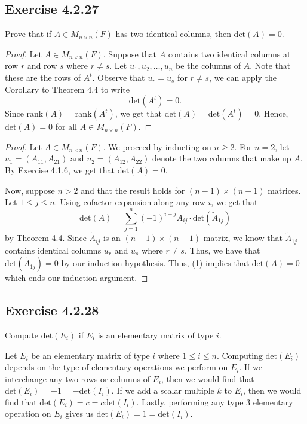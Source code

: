\subsection*{Exercise 4.2.27} Prove that if \( A \in {M}_{n \times n}(F) \) has two identical columns, then \( \text{det}(A) = 0  \).
\begin{proof}
    Let \( A \in {M}_{n \times n}(F) \). Suppose that \( A  \) contains two identical columns at row \( r  \) and row \( s  \) where \( r \neq s  \). Let \( {u}_{1}, {u}_{2}, \dots, {u}_{n}  \) be the columns of \( A \). Note that these are the rows of \( A^{t} \). Observe that \( {u}_{r} = {u}_{s} \) for \( r \neq s  \), we can apply the Corollary to Theorem 4.4 to write  
    \[  \text{det}(A^{t}) = 0.  \]
    Since \( \text{rank}(A) = \text{rank}(A^{t}) \), we get that \( \text{det}(A) = \text{det}(A^{t}) = 0  \). Hence, \( \text{det}(A) = 0 \) for all \( A \in {M}_{n \times n}(F)  \).
\end{proof}
\begin{proof}
Let \( A \in {M}_{n \times n}(F) \). We proceed by inducting on \( n \geq 2  \). For \( n = 2  \), let \( {u}_{1} = ({A}_{11}, {A}_{21}) \) and \( {u}_{2} = ({A}_{12}, {A}_{22} ) \) denote the two columns that make up \( A  \). By Exercise 4.1.6, we get that \( \text{det}(A) = 0  \).     

Now, suppose \( n > 2  \) and that the result holds for \( (n-1) \times (n-1)  \) matrices. Let \( 1 \leq j \leq n \). Using cofactor expansion along any row \( i \), we get that 
\[  \text{det}(A) = \sum_{ j=1 }^{ n } (-1)^{i + j} {A}_{ij} \cdot \text{det}({\tilde{A}}_{1j}) \tag{1} \] by Theorem 4.4.
Since \( {\tilde{A}}_{ij} \) is an \( (n-1) \times (n-1)  \) matrix, we know that \( {\tilde{A}}_{1j} \) contains identical columns \( {u}_{r}   \) and \( {u}_{s} \) where \( r \neq s  \). Thus, we have that \( \text{det}({\tilde{A}}_{1j}) = 0  \) by our induction hypothesis. Thus, (1) implies that \( \text{det}(A) = 0  \) which ends our induction argument. 
\end{proof}

\subsection*{Exercise 4.2.28} Compute \( \text{det}({E}_{i})  \) if \( {E}_{i} \) is an elementary matrix of type \( i  \).
\begin{solution}
Let \( {E}_{i} \) be an elementary matrix of type \( i \) where \( 1 \leq i \leq n  \). Computing \( \text{det}({E}_{i}) \) depends on the type of elementary operations we perform on \( {E}_{i} \). If we interchange any two rows or columns of \( {E}_{i}\), then we would find that \( \text{det}({E}_{i}) = - 1 = - \text{det}({I}_{i}) \). If we add a scalar multiple \( k  \) to \( {E}_{i} \), then we would find that \( \text{det}({E}_{i}) = c = c \text{det}({I}_{i})  \). Lastly, performing any type 3 elementary operation on \( {E}_{i} \) gives us \( \text{det}({E}_{i}) = 1 = \text{det}({I}_{i})   \).
\end{solution}


